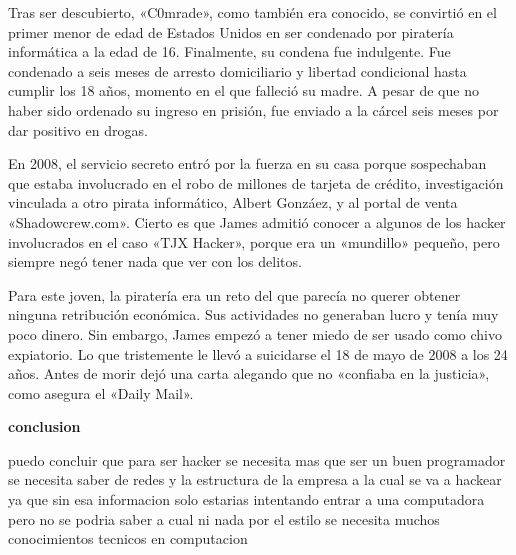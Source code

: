 \documentclass[11pt,a4paper]{article}
\begin{document}
\begin{multicols}{2}
Tras ser descubierto, «C0mrade», como también era conocido, se convirtió en el primer menor de edad de Estados Unidos en ser condenado por piratería informática a la edad de 16. Finalmente, su condena fue indulgente. Fue condenado a seis meses de arresto domiciliario y libertad condicional hasta cumplir los 18 años, momento en el que falleció su madre. A pesar de que no haber sido ordenado su ingreso en prisión, fue enviado a la cárcel seis meses por dar positivo en drogas.

En 2008, el servicio secreto entró por la fuerza en su casa porque sospechaban que estaba involucrado en el robo de millones de tarjeta de crédito, investigación vinculada a otro pirata informático, Albert Gonzáez, y al portal de venta «Shadowcrew.com». Cierto es que James admitió conocer a algunos de los hacker involucrados en el caso «TJX Hacker», porque era un «mundillo» pequeño, pero siempre negó tener nada que ver con los delitos.

Para este joven, la piratería era un reto del que parecía no querer obtener ninguna retribución económica. Sus actividades no generaban lucro y tenía muy poco dinero. Sin embargo, James empezó a tener miedo de ser usado como chivo expiatorio. Lo que tristemente le llevó a suicidarse el 18 de mayo de 2008 a los 24 años. Antes de morir dejó una carta alegando que no «confiaba en la justicia», como asegura el «Daily Mail».

\begin{center}
\textbf{conclusion}
\end{center}
  puedo concluir  que para ser hacker se necesita mas que ser un buen programador se necesita saber de redes y la estructura de la empresa a la cual se va a hackear ya que sin esa informacion solo estarias intentando entrar a una computadora pero no se podria saber a cual ni nada por el estilo se necesita muchos conocimientos tecnicos en computacion 


\end{multicols}
\end{document}
